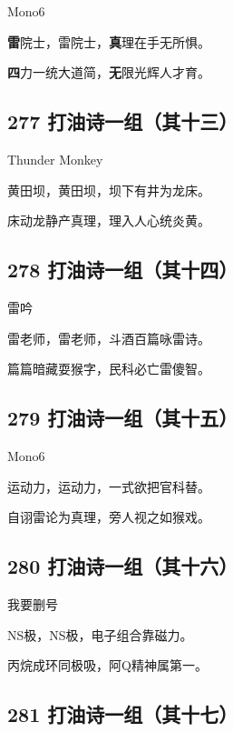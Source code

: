 {Mono6}

\textbf{雷}院士，雷院士，\textbf{真}理在手无所惧。

\textbf{四}力一统大道简，\textbf{无}限光辉人才育。

\hypertarget{ux6253ux6cb9ux8bd7ux4e00ux7ec4ux5176ux5341ux4e09}{%
\subsection{277
打油诗一组（其十三）}\label{ux6253ux6cb9ux8bd7ux4e00ux7ec4ux5176ux5341ux4e09}}

{Thunder Monkey}

黄田坝，黄田坝，坝下有井为龙床。

床动龙静产真理，理入人心统炎黄。

\hypertarget{ux6253ux6cb9ux8bd7ux4e00ux7ec4ux5176ux5341ux56db}{%
\subsection{278
打油诗一组（其十四）}\label{ux6253ux6cb9ux8bd7ux4e00ux7ec4ux5176ux5341ux56db}}

{雷吟}

雷老师，雷老师，斗酒百篇咏雷诗。

篇篇暗藏耍猴字，民科必亡雷傻智。

\hypertarget{ux6253ux6cb9ux8bd7ux4e00ux7ec4ux5176ux5341ux4e94}{%
\subsection{279
打油诗一组（其十五）}\label{ux6253ux6cb9ux8bd7ux4e00ux7ec4ux5176ux5341ux4e94}}

{Mono6}

运动力，运动力，一式欲把官科替。

自诩雷论为真理，旁人视之如猴戏。

\hypertarget{ux6253ux6cb9ux8bd7ux4e00ux7ec4ux5176ux5341ux516d}{%
\subsection{280
打油诗一组（其十六）}\label{ux6253ux6cb9ux8bd7ux4e00ux7ec4ux5176ux5341ux516d}}

{我要删号}

NS极，NS极，电子组合靠磁力。

丙烷成环同极吸，阿Q精神属第一。

\hypertarget{ux6253ux6cb9ux8bd7ux4e00ux7ec4ux5176ux5341ux4e03}{%
\subsection{281
打油诗一组（其十七）}\label{ux6253ux6cb9ux8bd7ux4e00ux7ec4ux5176ux5341ux4e03}}

